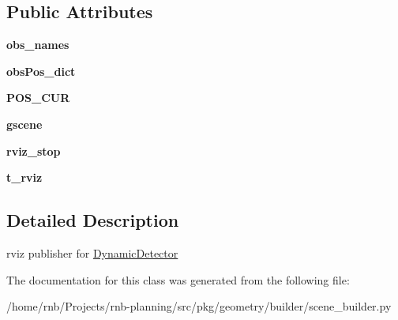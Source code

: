 \subsection*{Public Attributes}
\begin{DoxyCompactItemize}
\item 
\mbox{\label{classrnb-planning_1_1src_1_1pkg_1_1geometry_1_1builder_1_1scene__builder_1_1_rviz_publisher_a518b44f45d7e3f88a240ce45ffe5c5fe}} 
{\bfseries obs\+\_\+names}
\item 
\mbox{\label{classrnb-planning_1_1src_1_1pkg_1_1geometry_1_1builder_1_1scene__builder_1_1_rviz_publisher_a899f649198fd3aeec660ffaa15181167}} 
{\bfseries obs\+Pos\+\_\+dict}
\item 
\mbox{\label{classrnb-planning_1_1src_1_1pkg_1_1geometry_1_1builder_1_1scene__builder_1_1_rviz_publisher_a1db0e3ae44e9770f349d475f6da0dfda}} 
{\bfseries P\+O\+S\+\_\+\+C\+UR}
\item 
\mbox{\label{classrnb-planning_1_1src_1_1pkg_1_1geometry_1_1builder_1_1scene__builder_1_1_rviz_publisher_a2770d120d74f3a1f697f36d81acb4e29}} 
{\bfseries gscene}
\item 
\mbox{\label{classrnb-planning_1_1src_1_1pkg_1_1geometry_1_1builder_1_1scene__builder_1_1_rviz_publisher_a66d79845d6838b0493022886054137fe}} 
{\bfseries rviz\+\_\+stop}
\item 
\mbox{\label{classrnb-planning_1_1src_1_1pkg_1_1geometry_1_1builder_1_1scene__builder_1_1_rviz_publisher_abeb1a43e27890eded8c6a6e496c85249}} 
{\bfseries t\+\_\+rviz}
\end{DoxyCompactItemize}


\subsection{Detailed Description}
rviz publisher for \hyperlink{classrnb-planning_1_1src_1_1pkg_1_1geometry_1_1builder_1_1scene__builder_1_1_dynamic_detector}{Dynamic\+Detector} 

The documentation for this class was generated from the following file\+:\begin{DoxyCompactItemize}
\item 
/home/rnb/\+Projects/rnb-\/planning/src/pkg/geometry/builder/scene\+\_\+builder.\+py\end{DoxyCompactItemize}
